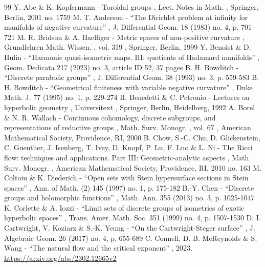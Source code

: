 \documentclass[11pt]{article}
\theoremstyle{definition}
\begin{document}

\begin{thebibliography}{99}
 Y. Abe \& K. Kopfermann - Toroidal groups , Lect. Notes in Math. , Springer, Berlin, 2001 no. 1759
 M. T. Anderson - “The Dirichlet problem at infinity for manifolds of negative curvature” , J. Differential Geom. 18 (1983) no. 4, p. 701-721
 M. R. Bridson \& A. Haefliger - Metric spaces of non-positive curvature , Grundlehren Math. Wissen. , vol. 319 , Springer, Berlin, 1999
 Y. Benoist \& D. Hulin - “Harmonic quasi-isometric maps. III: quotients of Hadamard manifolds” , Geom. Dedicata 217 (2023) no. 3, article ID 52, 37 pages
 B. H. Bowditch - “Discrete parabolic groups” , J. Differential Geom. 38 (1993) no. 3, p. 559-583
 B. H. Bowditch - “Geometrical finiteness with variable negative curvature” , Duke Math. J. 77 (1995) no. 1, p. 229-274
 R. Benedetti \& C. Petronio - Lectures on hyperbolic geometry , Universitext , Springer, Berlin, Heidelberg, 1992
 A. Borel \& N. R. Wallach - Continuous cohomology, discrete subgroups, and representations of reductive groups , Math. Surv. Monogr. , vol. 67 , American Mathematical Society, Providence, RI, 2000
 B. Chow, S.-C. Chu, D. Glickenstein, C. Guenther, J. Isenberg, T. Ivey, D. Knopf, P. Lu, F. Luo \& L. Ni - The Ricci flow: techniques and applications. Part III: Geometric-analytic aspects , Math. Surv. Monogr. , American Mathematical Society, Providence, RI, 2010 no. 163
 M. Coltoiu \& K. Diederich - “Open sets with Stein hypersurface sections in Stein spaces” , Ann. of Math. (2) 145 (1997) no. 1, p. 175-182
 B.-Y. Chen - “Discrete groups and holomorphic functions” , Math. Ann. 355 (2013) no. 3, p. 1025-1047
 K. Corlette \& A. Iozzi - “Limit sets of discrete groups of isometries of exotic hyperbolic spaces” , Trans. Amer. Math. Soc. 351 (1999) no. 4, p. 1507-1530
 D. I. Cartwright, V. Koziarz \& S.-K. Yeung - “On the Cartwright-Steger surface” , J. Algebraic Geom. 26 (2017) no. 4, p. 655-689
 C. Connell, D. B. McReynolds \& S. Wang - “The natural flow and the critical exponent” , 2023. \url{https://arxiv.org/abs/2302.12665v2}

\end{thebibliography}
\end{document}
